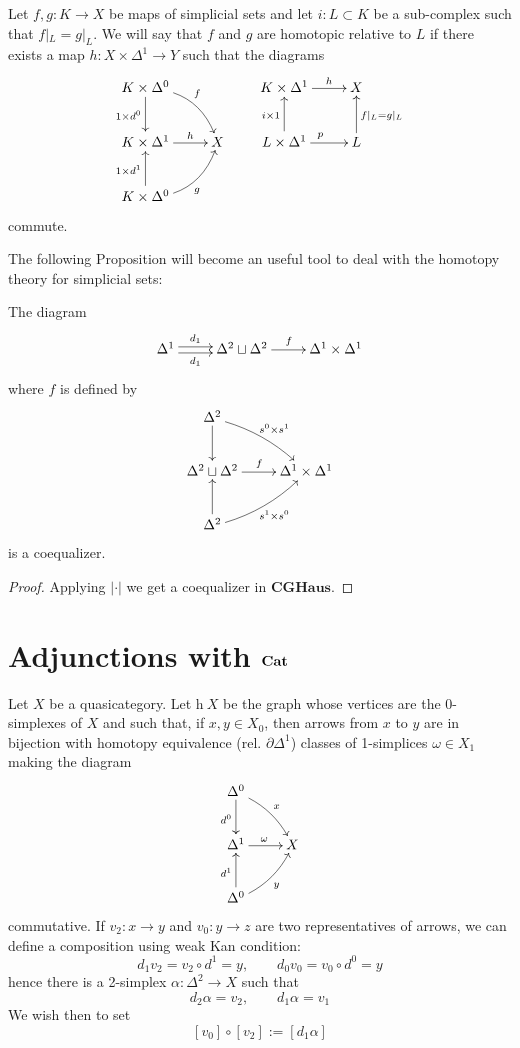 \begin{refsection}
\begin{defin}
Let $f,g \colon K \to X$ be maps of simplicial sets and let $i \colon L \subset K$ be a sub-complex such that $f |_L = g|_L$. We will say that $f$ and $g$ are homotopic relative to $L$ if there exists a map $h \colon X \times \Delta^1 \to Y$ such that the diagrams
\[
\xymatrix{
K \times \Delta^0 \ar[d]_{1 \times d^0} \ar@/^1pc/[dr]^f \\ K \times \Delta^1 \ar[r]^-h & X \\ K \times \Delta^0 \ar[u]^{1 \times d^1} \ar@/_1pc/[ur]_g
} \qquad \xymatrix{K \times \Delta^1 \ar[r]^-h & X \\ L \times \Delta^1 \ar[u]^{i \times 1} \ar[r]^p & L \ar[u]_{f|_L = g|_L}
}
\]
commute.
\end{defin}



The following Proposition will become an useful tool to deal with the homotopy theory for simplicial sets:

\begin{prop} \label{prop homotopy theory for sset coequalizer}
The diagram
\[
\xymatrix{
\Delta^1 \ar@<.5ex>[r]^-{d_1} \ar@<-.5ex>[r]_-{d_1} & \Delta^2 \sqcup \Delta^2 \ar[r]^f & \Delta^1 \times \Delta^1
}
\]
where $f$ is defined by
\[
\xymatrix{
\Delta^2 \ar[d] \ar@/^.5pc/[dr]^{s^0 \times s^1} \\ \Delta^2 \sqcup \Delta^2 \ar[r]^f & \Delta^1 \times \Delta^1 \\ \Delta^2 \ar[u] \ar@/_.5pc/[ur]_{s^1 \times s^0}
}
\]
is a coequalizer.
\end{prop}

\begin{proof}
Applying $| \cdot |$ we get a coequalizer in $\mathbf{CGHaus}$.
\end{proof}

\section{Adjunctions with $\mathbf{Cat}$}

Let $X$ be a quasicategory. Let $\mathrm h \: X$ be the graph whose vertices are the $0$-simplexes of $X$ and such that, if $x, y \in X_0$, then arrows from $x$ to $y$ are in bijection with homotopy equivalence ($\text{rel. } \partial \Delta^1$) classes of 1-simplices $\omega \in X_1$ making the diagram
\[
\xymatrix{
\Delta^0 \ar[d]_{d^0} \ar@/^.5pc/[dr]^x \\ \Delta^1 \ar[r]^\omega & X \\ \Delta^0 \ar[u]^{d^1} \ar@/_.5pc/[ur]_y
}
\]
commutative. If $v_2 \colon x \to y$ and $v_0 \colon y \to z$ are two representatives of arrows, we can define a composition using weak Kan condition:
\[
d_1 v_2 = v_2 \circ d^1 = y, \qquad d_0 v_0 = v_0 \circ d^0 = y
\]
hence there is a 2-simplex $\alpha \colon \Delta^2 \to X$ such that
\[
d_2 \alpha = v_2, \qquad d_1 \alpha = v_1
\]
We wish then to set
\begin{equation} \label{eq composition fundamental grupoid}
[v_0] \circ [v_2] := [d_1 \alpha]
\end{equation}


\end{refsection}
